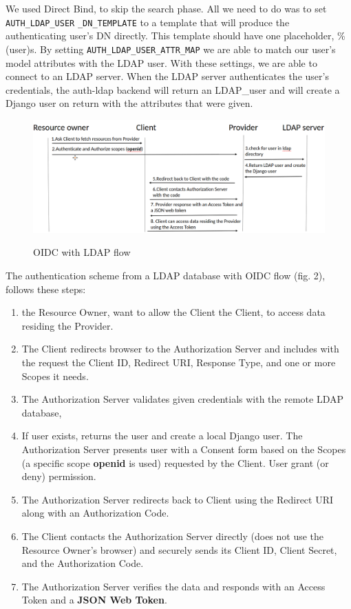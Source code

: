 We used Direct Bind, to skip the search phase. All we need to do was to set \verb|AUTH_LDAP_USER| \verb|_DN_TEMPLATE| to a template that will produce the authenticating user’s DN directly. This template should have one placeholder, \%(user)s. By setting \verb|AUTH_LDAP_USER_ATTR_MAP| we are able to match our user's model attributes with the LDAP user.
With these settings, we are able to connect to an LDAP server. When the LDAP server authenticates the user's credentials, the auth-ldap backend will return an LDAP\_user and will create a Django user on return with the attributes that were given.

\begin{figure}[htb]
	\centering
	\includegraphics[scale=0.3]{figures/LDAP.png}\\
	\caption{OIDC with LDAP flow}
\end{figure}

The authentication scheme from a LDAP database with OIDC flow (fig. 2), follows these steps:

\begin{enumerate}
	\item the Resource Owner, want to allow the Client the Client, to access data residing the Provider.
	
	\item The Client redirects browser to the Authorization Server and includes with the request the Client ID, Redirect URI, Response Type, and one or more Scopes it needs.
	
	\item  The Authorization Server validates given credentials with the remote LDAP database, 
	
	\item If user exists, returns the user and create a local Django user. The Authorization Server presents user with a Consent form based on the Scopes (a specific scope \textbf{openid} is used) requested by the Client. User grant (or deny) permission.
	
	\item The Authorization Server redirects back to Client using the Redirect URI along with an Authorization Code.
	
	\item The Client contacts the Authorization Server directly (does not use the Resource Owner’s browser) and securely sends its Client ID, Client Secret, and the Authorization Code.
	
	\item The Authorization Server verifies the data and responds with an Access Token and a \textbf{JSON Web Token}.
	
\end{enumerate}

